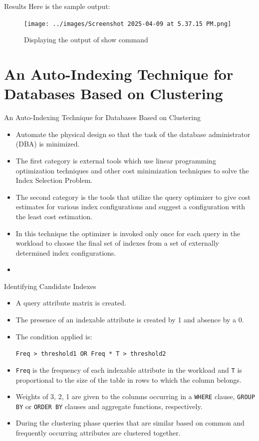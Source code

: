\documentclass[Serif, 10pt, brown]{beamer}
\theoremstyle{example}
\theoremstyle{plain}
\begin{document}
\begin{frame}{Results}
	Here is the sample output:
	\begin{figure}[H]
		\texttt{[image: ../images/Screenshot 2025-04-09 at 5.37.15 PM.png]}
		\caption{Displaying the output of show command}
	\end{figure}
\end{frame}

\section{An Auto-Indexing Technique for Databases Based on Clustering}

\begin{frame}{An Auto-Indexing Technique for Databases Based on Clustering}
	\begin{itemize}
		\item Automate the physical design so that the task of the database administrator (DBA) is minimized.
		\item The first category is external tools which use linear programming optimization techniques and other cost minimization techniques to solve the Index Selection Problem.
		\item The second category is the tools that utilize the query optimizer to give cost estimates for various index
		configurations and suggest a configuration with the least cost estimation.
		\item In this technique the optimizer is invoked only once for each query in the workload to choose the final set of indexes from a set of externally determined index configurations.
		\item 
	\end{itemize}
\end{frame}

\begin{frame}{Identifying Candidate Indexes}
	\begin{itemize}
		\item A query attribute matrix is created.
		\item The presence of an indexable attribute is created by 1 and absence by a 0.
		\item The condition applied is:
		
		\texttt{Freq > threshold1 OR Freq * T > threshold2}
		\item \texttt{Freq} is the frequency of each indexable attribute in the workload and \texttt{T} is proportional to the size of the table in rows to which the column belongs.
		\item Weights of 3, 2, 1 are given to the columns occurring in a {\tt WHERE} clause, {\tt GROUP BY} or {\tt ORDER BY} clauses and aggregate functions, respectively.
		\item During the clustering phase queries that are similar based on common and frequently occurring attributes are clustered together.
	\end{itemize}
\end{frame}
\end{document}
